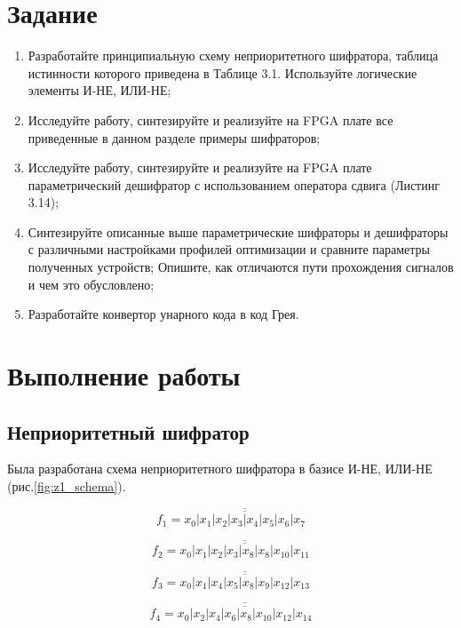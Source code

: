 \documentclass[a4paper,14pt]{article}
\begin{document}

\tableofcontents
\pagebreak
\section{Задание}

\begin{enumerate}
	\item Разработайте принципиальную схему неприоритетного шифратора, таблица истинности
	которого приведена в Таблице 3.1. Используйте логические элементы И-НЕ, ИЛИ-НЕ;
	
	\item Исследуйте работу, синтезируйте и реализуйте на FPGA плате все приведенные в данном
	разделе примеры шифраторов;
	
	\item Исследуйте работу, синтезируйте и реализуйте на FPGA плате параметрический дешифратор
	с использованием оператора сдвига (Листинг 3.14);
	
	\item Синтезируйте описанные выше параметрические шифраторы и дешифраторы с различными
	настройками профилей оптимизации и сравните параметры полученных устройств;
	Опишите, как отличаются пути прохождения сигналов и чем это обусловлено;
	
	\item Разработайте конвертор унарного кода в код Грея.
\end{enumerate}

\section{Выполнение работы}

\subsection{Неприоритетный шифратор}
 
Была разработана схема неприоритетного шифратора в базисе И-НЕ, ИЛИ-НЕ (рис.\ref{fig:z1_schema}).

$$ f_1 = \overline{\overline{x_0 | x_1 | x_2 | x_3 | x_4 | x_5 | x_6 | x_7}} $$

$$ f_2 = \overline{\overline{x_0 | x_1 | x_2 | x_3 | x_8 | x_8 | x_{10} | x_{11}}}$$

$$ f_3 = \overline{\overline{x_0 | x_1 | x_4 | x_5 | x_8 | x_9 | x_{12} | x_{13}}}$$

$$ f_4 = \overline{\overline{x_0 | x_2 | x_4 | x_6 | x_8 | x_{10} | x_{12} | x_{14}}} $$
\end{document}
